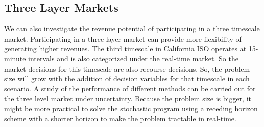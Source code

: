\documentclass[11pt,twoside]{article}
\begin{document}
\subsection{Three Layer Markets}
We can also investigate the revenue potential of participating in a three timescale market. Participating in a three layer market can provide more flexibility of generating higher revenues. The third timescale in California ISO operates at 15-minute intervals and is also categorized under the real-time market. So the market decisions for this timescale are also recourse decisions. So, the problem size will grow with the addition of decision variables for that timescale in each scenario. A study of the performance of different methods can be carried out for the three level market under uncertainty. Because the problem size is bigger, it might be more practical to solve the stochastic program using a receding horizon scheme with a shorter horizon to make the problem tractable in real-time.



\end{document}
